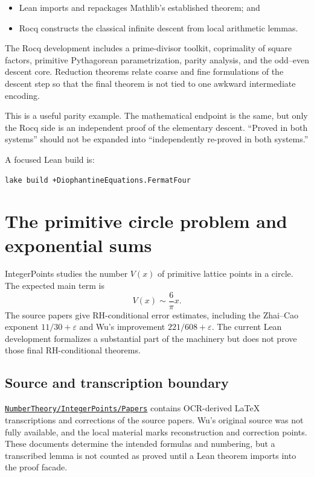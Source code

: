 \documentclass[
  10pt,
  a4paper,
  twoside,
  open=any,
  parskip=half,
  headings=big
]{scrreprt}
\newcommand{\CommitFull}{56a402bf82a9aab119fcbe3e96b991d387b221c5}
\newcommand{\RepoWeb}{https://github.com/VladimirReshetnikov/ProveIt}
\newcommand{\RepoTreeBase}{\RepoWeb/tree/\CommitFull}
\newcommand{\project}[1]{\textsf{#1}}
\newcommand{\RepoDir}[1]{\href{\RepoTreeBase/#1}{\nolinkurl{#1}}}
\begin{document}
\begin{itemize}
  \item Lean imports and repackages Mathlib's established theorem; and
  \item Rocq constructs the classical infinite descent from local arithmetic lemmas.
\end{itemize}

The Rocq development includes a prime-divisor toolkit, coprimality of square factors, primitive Pythagorean parametrization, parity analysis, and the odd--even descent core. Reduction theorems relate coarse and fine formulations of the descent step so that the final theorem is not tied to one awkward intermediate encoding.

This is a useful parity example. The mathematical endpoint is the same, but only the Rocq side is an independent proof of the elementary descent. ``Proved in both systems'' should not be expanded into ``independently re-proved in both systems.''

A focused Lean build is:

\begin{lstlisting}[language=bash]
lake build +DiophantineEquations.FermatFour
\end{lstlisting}

\section{The primitive circle problem and exponential sums}
\label{sec:integer-points}

\project{IntegerPoints} studies the number $V(x)$ of primitive lattice points in a circle. The expected main term is
\[
  V(x)\sim \frac{6}{\pi}x.
\]
The source papers give RH-conditional error estimates, including the Zhai--Cao exponent $11/30+\varepsilon$ and Wu's improvement $221/608+\varepsilon$. The current Lean development formalizes a substantial part of the machinery but does not prove those final RH-conditional theorems.

\subsection{Source and transcription boundary}

\RepoDir{NumberTheory/IntegerPoints/Papers} contains OCR-derived LaTeX transcriptions and corrections of the source papers. Wu's original source was not fully available, and the local material marks reconstruction and correction points. These documents determine the intended formulas and numbering, but a transcribed lemma is not counted as proved until a Lean theorem imports into the proof facade.
\end{document}
